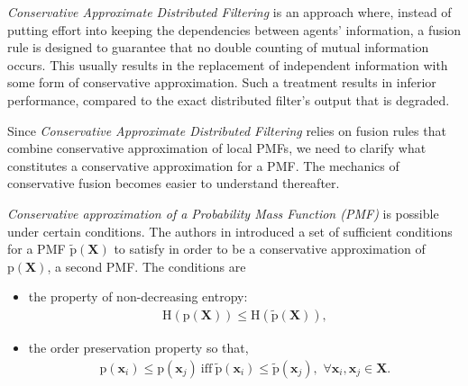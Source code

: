 \documentclass[conference]{IEEEtran}
\newcommand{\vect}[1]{{\mathbf{#1}}}
\theoremstyle{remark}
\newcommand{\pr}{\textrm{p}}
\begin{document}
\emph{Conservative Approximate Distributed Filtering} is an approach where, 
instead of putting effort into keeping the dependencies between agents' 
information, a fusion rule is designed to guarantee that no double counting of 
mutual information occurs. This usually results in the replacement of 
independent information with some form of conservative approximation. Such a 
treatment results in inferior performance, compared to the exact distributed 
filter's output that is degraded. 

Since \emph{Conservative Approximate Distributed Filtering} relies on
fusion rules that combine conservative approximation of local PMFs, we need to
clarify what constitutes a conservative approximation for a PMF. 
The mechanics of conservative fusion becomes easier to understand thereafter. 

\emph{Conservative approximation of a Probability Mass Function (PMF)} is 
possible under certain conditions. The authors in \cite{bailey2012conservative} 
introduced a set of sufficient conditions for a PMF $\tilde{\pr}(\vect{X})$ to 
satisfy in order to be a conservative approximation of $\pr(\vect{X})$, a 
second PMF. The conditions are
\begin{itemize}
\item the property of non-decreasing entropy:
$$\begin{aligned}
\text{H}(\pr(\vect{X})) \leq \text{H}(\tilde{\pr}(\vect{X})),
\end{aligned}$$
\item the order preservation property so that,
$$\begin{aligned}
\pr(\vect{x}_i) \leq \pr(\vect{x}_j) \ \text{iff}\  \tilde{\pr}(\vect{x}_i) \leq \tilde{\pr}(\vect{x}_j), \,\, \forall \vect{x}_i,\vect{x}_j\in\vect{X}.
\end{aligned}$$
\end{itemize}
\end{document}

